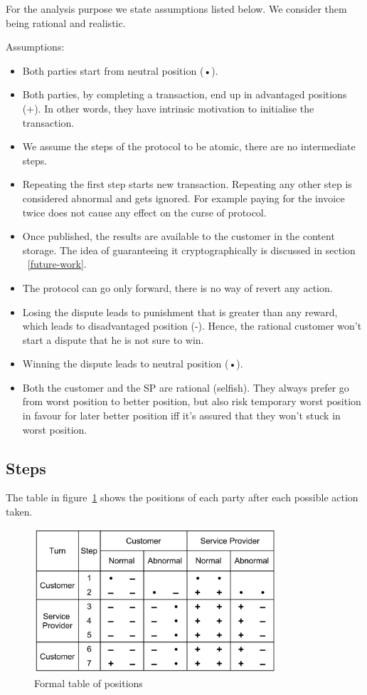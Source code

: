 \documentclass{ieeeaccess}
\begin{document}
For the analysis purpose we state assumptions listed below. We consider
them being rational and realistic.

Assumptions:

\begin{itemize}

\item
  Both parties start from neutral position (•).
\item
  Both parties, by completing a transaction, end up in advantaged
  positions (+). In other words, they have intrinsic motivation to
  initialise the transaction.
\item
  We assume the steps of the protocol to be atomic, there are no
  intermediate steps.
\item
  Repeating the first step starts new transaction. Repeating any other
  step is considered abnormal and gets ignored. For example paying for
  the invoice twice does not cause any effect on the curse of protocol.
\item
  Once published, the results are available to the customer in the
  content storage. The idea of guaranteeing it cryptographically is
  discussed in section ~\ref{future-work}.
\item
  The protocol can go only forward, there is no way of revert any
  action.
\item
  Losing the dispute leads to punishment that is greater than any
  reward, which leads to disadvantaged position (-). Hence, the rational
  customer won't start a dispute that he is not sure to win.
\item
  Winning the dispute leads to neutral position (•).
\item
  Both the customer and the SP are rational (selfish). They always
  prefer go from worst position to better position, but also risk
  temporary worst position in favour for later better position iff it's
  assured that they won't stuck in worst position.
\end{itemize}

\subsection{Steps}\label{steps}

The table in figure~\ref{fig:positions} shows the positions of each party after each possible
action taken.

\begin{figure}[h!]
\includegraphics[width=9cm]{formal-table-of-positions.png}
\centering
\caption{Formal table of positions}
\label{fig:positions}
\end{figure}
\end{document}
